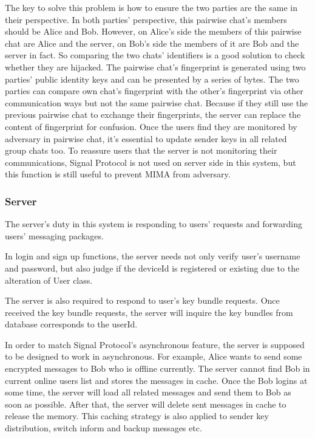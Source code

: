 \begin{enumerate}[label=(\roman*)]
The key to solve this problem is how to ensure the two parties are the same in their perspective. In both parties' perspective, this pairwise chat's members should be Alice and Bob. However, on Alice's side the members of this pairwise chat are Alice and the server, on Bob's side the members of it are Bob and the server in fact. So comparing the two chats' identifiers is a good solution to check whether they are hijacked. The pairwise chat's fingerprint is generated using two parties' public identity keys and can be presented by a series of bytes. The two parties can compare own chat's fingerprint with the other's fingerprint via other communication ways but not the same pairwise chat. Because if they still use the previous pairwise chat to exchange their fingerprints, the server can replace the content of fingerprint for confusion. Once the users find they are monitored by adversary in pairwise chat, it's essential to update sender keys in all related group chats too. To reassure users that the server is not monitoring their communications, Signal Protocol is not used on server side in this system, but this function is still useful to prevent MIMA from adversary.
\end{enumerate}
\subsubsection{Server}
The server's duty in this system is responding to users' requests and forwarding users' messaging packages. 

In login and sign up functions, the server needs not only verify user's username and password, but also judge if the deviceId is registered or existing due to the alteration of User class.

The server is also required to respond to user's key bundle requests. Once received the key bundle requests, the server will inquire the key bundles from database corresponds to the userId.

In order to match Signal Protocol's asynchronous feature, the server is supposed to be designed to work in asynchronous. For example, Alice wants to send some encrypted messages to Bob who is offline currently. The server cannot find Bob in current online users list and stores the messages in cache. Once the Bob logins at some time, the server will load all related messages and send them to Bob as soon as possible. After that, the server will delete sent messages in cache to release the memory. This caching strategy is also applied to sender key distribution, switch inform and backup messages etc.

